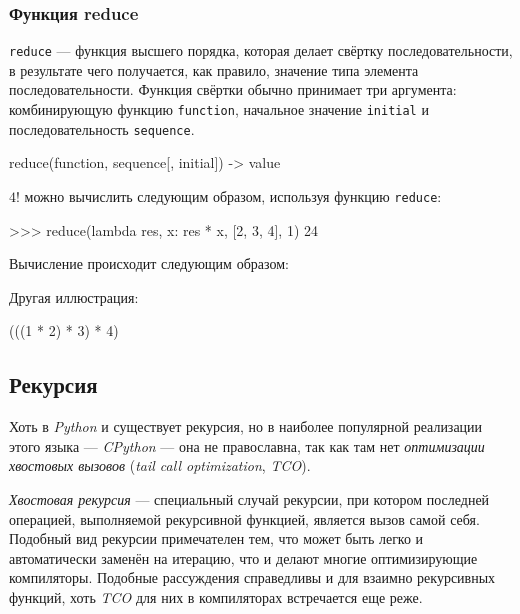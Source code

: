 \subsubsection{Функция reduce}
\lstinline{reduce} — функция высшего порядка, которая делает свёртку последовательности, в результате чего получается, как правило, значение типа элемента последовательности. Функция свёртки обычно принимает три аргумента: комбинирующую функцию \lstinline{function}, начальное значение \lstinline{initial} и последовательность \lstinline{sequence}.
\begin{pylst}{}{}
reduce(function, sequence[, initial]) -> value
\end{pylst}

$4!$ можно вычислить следующим образом, используя функцию \lstinline{reduce}:
\begin{pylst}{}{}
>>> reduce(lambda res, x: res * x, [2, 3, 4], 1)
24
\end{pylst}

Вычисление происходит следующим образом:
\begin{center}
\end{center}

Другая иллюстрация:
\begin{pylst}{}{}
(((1 * 2) * 3) * 4)
\end{pylst}

\subsection{Рекурсия}
Хоть в \emph{Python} и существует рекурсия, но в наиболее популярной реализации этого языка — \emph{CPython} — она не православна, так как там нет \emph{оптимизации хвостовых вызовов} (\emph{tail call optimization}, \emph{TCO}).

\emph{Хвостовая рекурсия} — специальный случай рекурсии, при котором последней операцией, выполняемой рекурсивной функцией, является вызов самой себя. Подобный вид рекурсии примечателен тем, что может быть легко и автоматически заменён на итерацию, что и делают многие оптимизирующие компиляторы. Подобные рассуждения справедливы и для взаимно рекурсивных функций, хоть \emph{TCO} для них в компиляторах встречается еще реже.

